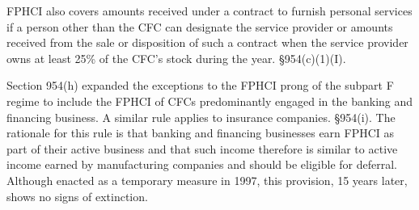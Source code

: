 FPHCI also covers amounts received under a contract to furnish personal services if a person other than the CFC can designate the service provider or amounts received from the sale or disposition of such a contract when the service provider owns at least 25\% of the CFC's stock during the year.  \S 954(c)(1)(I). 

Section 954(h) expanded the exceptions to the FPHCI prong of the subpart F regime to include the FPHCI of CFCs predominantly engaged in the banking and financing business.  A similar rule applies to insurance companies.  \S 954(i).  The rationale for this rule is that banking and financing businesses earn FPHCI as part of their active business and that such income therefore is similar to active income earned by manufacturing companies and should be eligible for deferral.  Although enacted as a temporary measure in 1997, this provision, 15 years later, shows no signs of extinction.       


